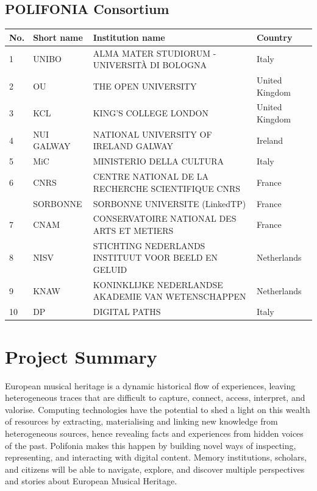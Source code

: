 \subsection*{POLIFONIA Consortium}

\begin{tabular}{|l|l|p{9.5cm}|l|}\hline
\textbf{No.} & \textbf{Short name} & \textbf{Institution name} & \textbf{Country}\\\hline  
1 & UNIBO & ALMA MATER STUDIORUM - UNIVERSIT\`A DI BOLOGNA & Italy\\\hline  
2 & OU & THE OPEN UNIVERSITY & United Kingdom\\\hline  
3 & KCL & KING'S COLLEGE LONDON & United Kingdom\\\hline  
4 & NUI GALWAY & NATIONAL UNIVERSITY OF IRELAND GALWAY & Ireland\\\hline  
5 & MiC & MINISTERIO DELLA CULTURA & Italy\\\hline  
6 & CNRS & CENTRE NATIONAL DE LA RECHERCHE SCIENTIFIQUE CNRS & France\\\hline  
  & SORBONNE & SORBONNE UNIVERSITE (LinkedTP) & France\\\hline  
7 & CNAM & CONSERVATOIRE NATIONAL DES ARTS ET METIERS & France\\\hline  
8 & NISV & STICHTING NEDERLANDS INSTITUUT VOOR BEELD EN GELUID & Netherlands\\\hline  
9 & KNAW & KONINKLIJKE NEDERLANDSE AKADEMIE VAN WETENSCHAPPEN & Netherlands\\\hline  
10 & DP & DIGITAL PATHS & Italy\\\hline  
\end{tabular}


\clearpage


\pagestyle{empty}


\section*{Project Summary}

European musical heritage is a dynamic historical flow of experiences, leaving heterogeneous traces that are difficult to capture, connect, access, interpret, and valorise. Computing technologies have the potential to shed a light on this wealth of resources by extracting, materialising and linking new knowledge from heterogeneous sources, hence revealing facts and experiences from hidden voices of the past. Polifonia makes this happen by building novel ways of inspecting, representing, and interacting with digital content. Memory institutions, scholars, and citizens will be able to navigate, explore, and discover multiple perspectives and stories about European Musical Heritage.

